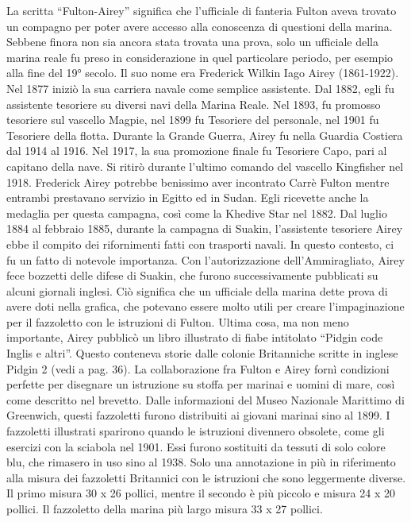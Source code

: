 La scritta ``Fulton-Airey'' significa che l'ufficiale di fanteria Fulton
aveva trovato un compagno per poter avere accesso alla conoscenza di
questioni della marina. Sebbene finora non sia ancora stata trovata una
prova, solo un ufficiale della marina reale fu preso in considerazione
in quel particolare periodo, per esempio alla fine del 19° secolo. Il
suo nome era Frederick Wilkin Iago Airey (1861-1922). Nel 1877 iniziò la
sua carriera navale come semplice assistente. Dal 1882, egli fu
assistente tesoriere su diversi navi della Marina Reale. Nel 1893, fu
promosso tesoriere sul vascello Magpie, nel 1899 fu Tesoriere del
personale, nel 1901 fu Tesoriere della flotta. Durante la Grande Guerra,
Airey fu nella Guardia Costiera dal 1914 al 1916. Nel 1917, la sua
promozione finale fu Tesoriere Capo, pari al capitano della nave. Si
ritirò durante l'ultimo comando del vascello Kingfisher nel 1918.
Frederick Airey potrebbe benissimo aver incontrato Carrè Fulton mentre
entrambi prestavano servizio in Egitto ed in Sudan. Egli ricevette anche
la medaglia per questa campagna, così come la Khedive Star nel 1882. Dal
luglio 1884 al febbraio 1885, durante la campagna di Suakin,
l'assistente tesoriere Airey ebbe il compito dei rifornimenti fatti con
trasporti navali. In questo contesto, ci fu un fatto di notevole
importanza. Con l'autorizzazione dell'Ammiragliato, Airey fece bozzetti
delle difese di Suakin, che furono successivamente pubblicati su alcuni
giornali inglesi. Ciò significa che un ufficiale della marina dette
prova di avere doti nella grafica, che potevano essere molto utili per
creare l'impaginazione per il fazzoletto con le istruzioni di Fulton.
Ultima cosa, ma non meno importante, Airey pubblicò un libro illustrato
di fiabe intitolato ``Pidgin code Inglis e altri''. Questo conteneva
storie dalle colonie Britanniche scritte in inglese Pidgin 2 (vedi a
pag. 36). La collaborazione fra Fulton e Airey fornì condizioni perfette
per disegnare un istruzione su stoffa per marinai e uomini di mare, così
come descritto nel brevetto. Dalle informazioni del Museo Nazionale
Marittimo di Greenwich, questi fazzoletti furono distribuiti ai giovani
marinai sino al 1899. I fazzoletti illustrati sparirono quando le
istruzioni divennero obsolete, come gli esercizi con la sciabola nel
1901. Essi furono sostituiti da tessuti di solo colore blu, che rimasero
in uso sino al 1938. Solo una annotazione in più in riferimento alla
misura dei fazzoletti Britannici con le istruzioni che sono leggermente
diverse. Il primo misura 30 x 26 pollici, mentre il secondo è più
piccolo e misura 24 x 20 pollici. Il fazzoletto della marina più largo
misura 33 x 27 pollici.

